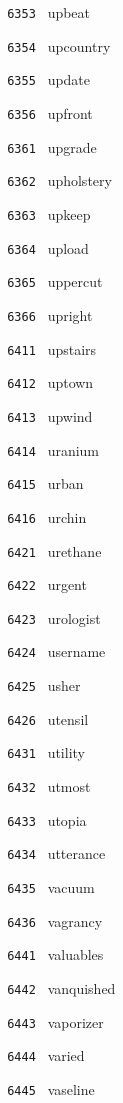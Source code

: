 \documentclass[11pt]{article}
\begin{document}
\begin{multicols}{6}
\noindent \texttt{ 6353 } upbeat  \par
\noindent \texttt{ 6354 } upcountry  \par
\noindent \texttt{ 6355 } update  \par
\noindent \texttt{ 6356 } upfront  \par
\noindent \texttt{ 6361 } upgrade  \par
\noindent \texttt{ 6362 } upholstery  \par
\noindent \texttt{ 6363 } upkeep  \par
\noindent \texttt{ 6364 } upload  \par
\noindent \texttt{ 6365 } uppercut  \par
\noindent \texttt{ 6366 } upright  \par
\noindent \texttt{ 6411 } upstairs  \par
\noindent \texttt{ 6412 } uptown  \par
\noindent \texttt{ 6413 } upwind  \par
\noindent \texttt{ 6414 } uranium  \par
\noindent \texttt{ 6415 } urban  \par
\noindent \texttt{ 6416 } urchin  \par
\noindent \texttt{ 6421 } urethane  \par
\noindent \texttt{ 6422 } urgent  \par
\noindent \texttt{ 6423 } urologist  \par
\noindent \texttt{ 6424 } username  \par
\noindent \texttt{ 6425 } usher  \par
\noindent \texttt{ 6426 } utensil  \par
\noindent \texttt{ 6431 } utility  \par
\noindent \texttt{ 6432 } utmost  \par
\noindent \texttt{ 6433 } utopia  \par
\noindent \texttt{ 6434 } utterance  \par
\noindent \texttt{ 6435 } vacuum  \par
\noindent \texttt{ 6436 } vagrancy  \par
\noindent \texttt{ 6441 } valuables  \par
\noindent \texttt{ 6442 } vanquished  \par
\noindent \texttt{ 6443 } vaporizer  \par
\noindent \texttt{ 6444 } varied  \par
\noindent \texttt{ 6445 } vaseline  \par

\end{multicols}
\end{document}
